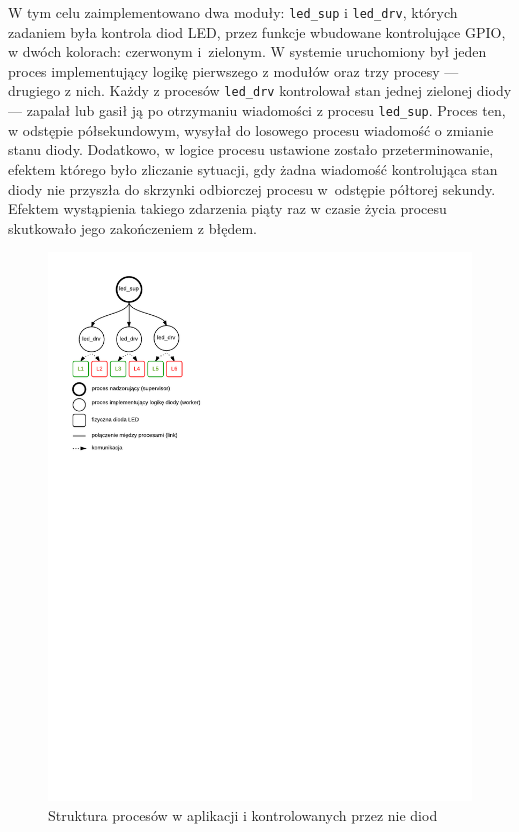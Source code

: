 W tym celu zaimplementowano dwa moduły: \texttt{led\_sup} i \texttt{led\_drv}, których zadaniem była kontrola diod LED, przez funkcje wbudowane kontrolujące GPIO, w dwóch kolorach: czerwonym i~zielonym.
W systemie uruchomiony był jeden proces implementujący logikę pierwszego z modułów oraz trzy procesy --- drugiego z nich.
Każdy z procesów \texttt{led\_drv} kontrolował stan jednej zielonej diody --- zapalał lub gasił ją po otrzymaniu wiadomości z procesu \texttt{led\_sup}. Proces ten, w odstępie półsekundowym, wysyłał do losowego procesu wiadomość o zmianie stanu diody. Dodatkowo, w logice procesu ustawione zostało przeterminowanie, efektem którego było zliczanie sytuacji, gdy żadna wiadomość kontrolująca stan diody nie przyszła do skrzynki odbiorczej procesu w~odstępie półtorej sekundy.
Efektem wystąpienia takiego zdarzenia piąty raz w czasie życia procesu skutkowało jego zakończeniem z błędem.

\begin{figure}[h]
\centerline{\includegraphics[scale=1, clip, trim=10mm 175mm 135mm 10mm]{example_led_processes}}
\caption{Struktura procesów w aplikacji i kontrolowanych przez nie diod}
\label{fig:exampleledprocesses}
\end{figure}

